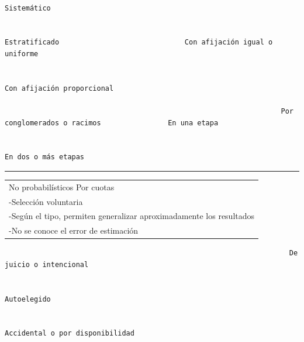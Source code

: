 \documentclass[]{article}
\begin{document}
\begin{verbatim}
                                                                  Sistemático                                

                                                                  Estratificado                              Con afijación igual o uniforme
                                                                                                             
                                                                                                             Con afijación proporcional

                                                                  Por conglomerados o racimos                En una etapa
                                                                                                             
                                                                                                             En dos o más etapas
\end{verbatim}

\begin{center}\rule{0.5\linewidth}{\linethickness}\end{center}

\begin{longtable}[]{@{}l@{}}
\toprule
\endhead
\begin{minipage}[t]{0.95\columnwidth}\raggedright
No probabilísticos Por cuotas\strut
\end{minipage}\tabularnewline
\begin{minipage}[t]{0.95\columnwidth}\raggedright
-Selección voluntaria\strut
\end{minipage}\tabularnewline
\begin{minipage}[t]{0.95\columnwidth}\raggedright
-Según el tipo, permiten generalizar aproximadamente los resultados\strut
\end{minipage}\tabularnewline
\begin{minipage}[t]{0.95\columnwidth}\raggedright
-No se conoce el error de estimación\strut
\end{minipage}\tabularnewline
\bottomrule
\end{longtable}

\begin{verbatim}
                                                                    De juicio o intencional

                                                                    Autoelegido

                                                                    Accidental o por disponibilidad
\end{verbatim}
\end{document}
